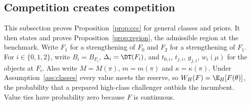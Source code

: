 \subsection{Competition creates competition}\label{app:prop2}

This subsection proves Proposition~\ref{prop:ccc} for general classes and priors. It then states and proves
Proposition~\ref{prop:region}, the admissible region at the benchmark. Write \(F_1\) for a strengthening of \(F_0\) and \(F_2\) for a
strengthening of \(F_1\). For \(i\in\{0,1,2\}\), write \(B_i=B_{F_i}\), \(\Delta_i=\DT(F_i)\), and \(t_{0,i}\),
\(t_{j,i}\), \(g_{j,i}\), \(w_i(\mu)\) for the objects at \(F_i\). Also write \(M=M(\pi)\), \(m=m(\pi)\) and
\(\kappa=\kappa(\pi)\). Under Assumption~\ref{ass:classes} every value meets the reserve, so
\(W_H(F)=\E_H[F(\theta)]\), the probability that a prepared high-class challenger outbids the incumbent. Value ties
have probability zero because \(F\) is continuous.

